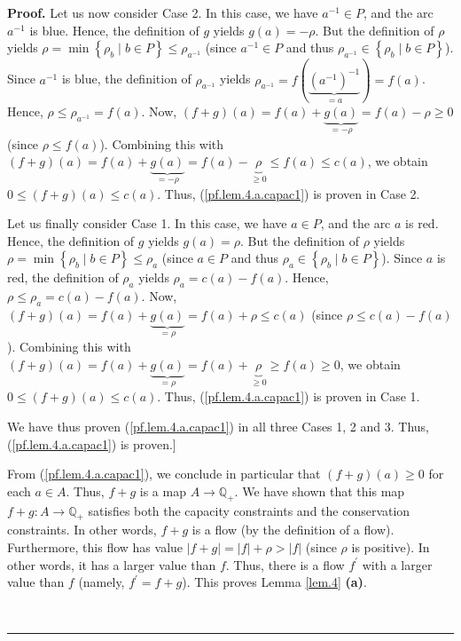 \documentclass[numbers=enddot,12pt,final,onecolumn,notitlepage]{scrartcl}%
\theoremstyle{definition}
\newenvironment{proof}[1][Proof]{\noindent\textbf{#1.} }{\ \rule{0.5em}{0.5em}}
\begin{document}
\begin{proof}
Let us now consider Case 2. In this case, we have $a^{-1}\in P$, and the arc
$a^{-1}$ is blue. Hence, the definition of $g$ yields $g\left(  a\right)
=-\rho$. But the definition of $\rho$ yields $\rho=\min\left\{  \rho_{b}\mid
b\in P\right\}  \leq\rho_{a^{-1}}$ (since $a^{-1}\in P$ and thus $\rho
_{a^{-1}}\in\left\{  \rho_{b}\mid b\in P\right\}  $). Since $a^{-1}$ is blue,
the definition of $\rho_{a^{-1}}$ yields $\rho_{a^{-1}}=f\left(
\underbrace{\left(  a^{-1}\right)  ^{-1}}_{=a}\right)  =f\left(  a\right)  $.
Hence, $\rho\leq\rho_{a^{-1}}=f\left(  a\right)  $. Now, $\left(  f+g\right)
\left(  a\right)  =f\left(  a\right)  +\underbrace{g\left(  a\right)
}_{=-\rho}=f\left(  a\right)  -\rho\geq0$ (since $\rho\leq f\left(  a\right)
$). Combining this with $\left(  f+g\right)  \left(  a\right)  =f\left(
a\right)  +\underbrace{g\left(  a\right)  }_{=-\rho}=f\left(  a\right)
-\underbrace{\rho}_{\geq0}\leq f\left(  a\right)  \leq c\left(  a\right)  $,
we obtain $0\leq\left(  f+g\right)  \left(  a\right)  \leq c\left(  a\right)
$. Thus, (\ref{pf.lem.4.a.capac1}) is proven in Case 2.

Let us finally consider Case 1. In this case, we have $a\in P$, and the arc
$a$ is red. Hence, the definition of $g$ yields $g\left(  a\right)  =\rho$.
But the definition of $\rho$ yields $\rho=\min\left\{  \rho_{b}\mid b\in
P\right\}  \leq\rho_{a}$ (since $a\in P$ and thus $\rho_{a}\in\left\{
\rho_{b}\mid b\in P\right\}  $). Since $a$ is red, the definition of $\rho
_{a}$ yields $\rho_{a}=c\left(  a\right)  -f\left(  a\right)  $. Hence,
$\rho\leq\rho_{a}=c\left(  a\right)  -f\left(  a\right)  $. Now, $\left(
f+g\right)  \left(  a\right)  =f\left(  a\right)  +\underbrace{g\left(
a\right)  }_{=\rho}=f\left(  a\right)  +\rho\leq c\left(  a\right)  $ (since
$\rho\leq c\left(  a\right)  -f\left(  a\right)  $). Combining this with
$\left(  f+g\right)  \left(  a\right)  =f\left(  a\right)
+\underbrace{g\left(  a\right)  }_{=\rho}=f\left(  a\right)  +\underbrace{\rho
}_{\geq0}\geq f\left(  a\right)  \geq0$, we obtain $0\leq\left(  f+g\right)
\left(  a\right)  \leq c\left(  a\right)  $. Thus, (\ref{pf.lem.4.a.capac1})
is proven in Case 1.

We have thus proven (\ref{pf.lem.4.a.capac1}) in all three Cases 1, 2 and 3.
Thus, (\ref{pf.lem.4.a.capac1}) is proven.]

From (\ref{pf.lem.4.a.capac1}), we conclude in particular that $\left(
f+g\right)  \left(  a\right)  \geq0$ for each $a\in A$. Thus, $f+g$ is a map
$A\rightarrow\mathbb{Q}_{+}$. We have shown that this map $f+g:A\rightarrow
\mathbb{Q}_{+}$ satisfies both the capacity constraints and the conservation
constraints. In other words, $f+g$ is a flow (by the definition of a flow).
Furthermore, this flow has value $\left\vert f+g\right\vert =\left\vert
f\right\vert +\rho>\left\vert f\right\vert $ (since $\rho$ is positive). In
other words, it has a larger value than $f$. Thus, there is a flow $f^{\prime
}$ with a larger value than $f$ (namely, $f^{\prime}=f+g$). This proves Lemma
\ref{lem.4} \textbf{(a)}.


\end{proof}
\end{document}
